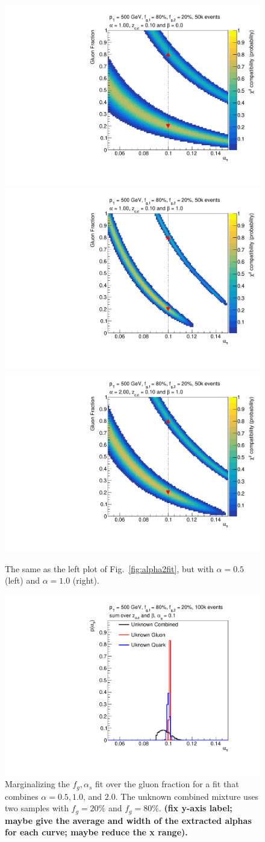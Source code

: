 \begin{figure}[h!]
\begin{center}
\includegraphics[width = 0.49\columnwidth]{figures/banana_alpha_10beta_0_zcut_123451324.pdf}\includegraphics[width = 0.49\columnwidth]{figures/banana_alpha_10beta_10_zcut_123451324.pdf}\\\includegraphics[width = 0.49\columnwidth]{figures/banana_alpha_20beta_10_zcut_123451324.pdf}
\end{center}
\caption{The same as the left plot of Fig.~\ref{fig:alpha2fit}, but with $\alpha=0.5$ (left) and $\alpha=1.0$ (right).}
\label{fig:morebananas}
\end{figure}

\begin{figure}[h!]
\begin{center}
\includegraphics[width = 0.49\columnwidth]{figures/combination23451324.pdf}
\end{center}
\caption{Marginalizing the $f_g,\alpha_s$ fit over the gluon fraction for a fit that combines $\alpha=0.5, 1.0$, and $2.0$.  The unknown combined mixture uses two samples with $f_g=20\%$ and $f_g=80\%$. \textbf{(fix y-axis label; maybe give the average and width of the extracted alphas for each curve; maybe reduce the x range).}}
\label{fig:combo}
\end{figure}

